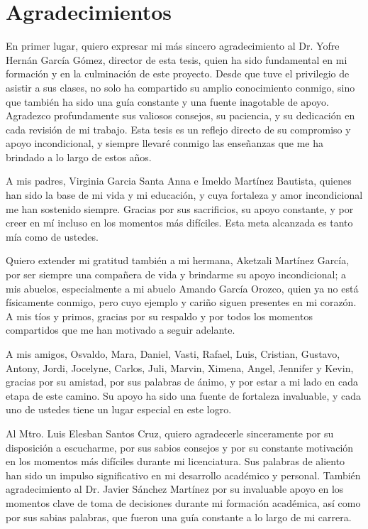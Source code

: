 \documentclass[
  us-letterpaper,
]{scrreprt}
\theoremstyle{plain}
\theoremstyle{definition}
\theoremstyle{definition}
\theoremstyle{remark}
\begin{document}
\chapter*{Agradecimientos}
En primer lugar, quiero expresar mi más sincero agradecimiento al Dr. Yofre Hernán García Gómez, director de esta tesis, quien ha sido fundamental en mi formación y en la culminación de este proyecto. Desde que tuve el privilegio de asistir a sus clases, no solo ha compartido su amplio conocimiento conmigo, sino que también ha sido una guía constante y una fuente inagotable de apoyo. Agradezco profundamente sus valiosos consejos, su paciencia, y su dedicación en cada revisión de mi trabajo. Esta tesis es un reflejo directo de su compromiso y apoyo incondicional, y siempre llevaré conmigo las enseñanzas que me ha brindado a lo largo de estos años.

A mis padres, Virginia Garcia Santa Anna e Imeldo Martínez Bautista, quienes han sido la base de mi vida y mi educación, y cuya fortaleza y amor incondicional me han sostenido siempre. Gracias por sus sacrificios, su apoyo constante, y por creer en mí incluso en los momentos más difíciles. Esta meta alcanzada es tanto mía como de ustedes.

Quiero extender mi gratitud también a mi hermana, Aketzali Martínez García, por ser siempre una compañera de vida y brindarme su apoyo incondicional; a mis abuelos, especialmente a mi abuelo Amando García Orozco, quien ya no está físicamente conmigo, pero cuyo ejemplo y cariño siguen presentes en mi corazón. A mis tíos y primos, gracias por su respaldo y por todos los momentos compartidos que me han motivado a seguir adelante.

A mis amigos, Osvaldo, Mara, Daniel, Vasti, Rafael, Luis, Cristian, Gustavo, Antony, Jordi, Jocelyne, Carlos, Juli, Marvin, Ximena, Angel, Jennifer y Kevin, gracias por su amistad, por sus palabras de ánimo, y por estar a mi lado en cada etapa de este camino. Su apoyo ha sido una fuente de fortaleza invaluable, y cada uno de ustedes tiene un lugar especial en este logro. 

Al Mtro. Luis Elesban Santos Cruz, quiero agradecerle sinceramente por su disposición a escucharme, por sus sabios consejos y por su constante motivación en los momentos más difíciles durante mi licenciatura. Sus palabras de aliento han sido un impulso significativo en mi desarrollo académico y personal. También agradecimiento al Dr. Javier Sánchez Martínez por su invaluable apoyo en los momentos clave de toma de decisiones durante mi formación académica, así como por sus sabias palabras, que fueron una guía constante a lo largo de mi carrera.
\end{document}
